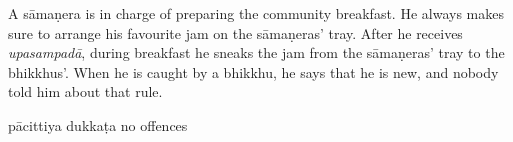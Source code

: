 \begin{exam}{\autoExamName}
\begin{problem*}
\begin{parts}
      \bigskip

      \item A sāmaṇera is in charge of preparing the community breakfast. He
      always makes sure to arrange his favourite jam on the sāmaṇeras' tray.
      After he receives \emph{upasampadā}, during breakfast he sneaks the jam
      from the sāmaṇeras' tray to the bhikkhus'. When he is caught by a bhikkhu,
      he says that he is new, and nobody told him about that rule.

      \bigskip

      \begin{answers}{3}
        \bChoices
         pācittiya\eAns
         dukkaṭa\eAns
         no offences\eAns
        \eChoices
      \end{answers}

    \end{parts}

  \end{problem*}

\end{exam}
